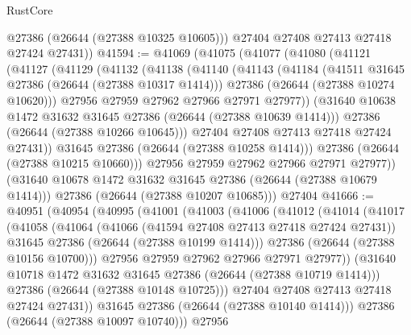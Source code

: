 \begin{lexlean}{RustCore}
\begin{coremodule}
          @27386
          (@26644 (@27388 @10325 @10605)))
        @27404
        @27408
        @27413
        @27418
        @27424
        @27431))
@41594 := @41069
    (@41075
      (@41077
        (@41080
          (@41121
            (@41127
              (@41129
                (@41132
                  (@41138
                    (@41140
                      (@41143
                        (@41184
                          (@41511 @31645 @27386 (@26644 (@27388 @10317 @1414)))
                          @27386
                          (@26644 (@27388 @10274 @10620)))
                        @27956
                        @27959
                        @27962
                        @27966
                        @27971
                        @27977))
                    (@31640 @10638 @1472 @31632 @31645 @27386 (@26644 (@27388 @10639 @1414)))
                    @27386
                    (@26644 (@27388 @10266 @10645)))
                  @27404
                  @27408
                  @27413
                  @27418
                  @27424
                  @27431))
              @31645
              @27386
              (@26644 (@27388 @10258 @1414)))
            @27386
            (@26644 (@27388 @10215 @10660)))
          @27956
          @27959
          @27962
          @27966
          @27971
          @27977))
      (@31640 @10678 @1472 @31632 @31645 @27386 (@26644 (@27388 @10679 @1414)))
      @27386
      (@26644 (@27388 @10207 @10685)))
    @27404
@41666 := @40951
    (@40954
      (@40995
        (@41001
          (@41003
            (@41006
              (@41012
                (@41014
                  (@41017
                    (@41058
                      (@41064
                        (@41066 (@41594 @27408 @27413 @27418 @27424 @27431))
                        @31645
                        @27386
                        (@26644 (@27388 @10199 @1414)))
                      @27386
                      (@26644 (@27388 @10156 @10700)))
                    @27956
                    @27959
                    @27962
                    @27966
                    @27971
                    @27977))
                (@31640 @10718 @1472 @31632 @31645 @27386 (@26644 (@27388 @10719 @1414)))
                @27386
                (@26644 (@27388 @10148 @10725)))
              @27404
              @27408
              @27413
              @27418
              @27424
              @27431))
          @31645
          @27386
          (@26644 (@27388 @10140 @1414)))
        @27386
        (@26644 (@27388 @10097 @10740)))
      @27956

\end{coremodule}
\end{lexlean}
